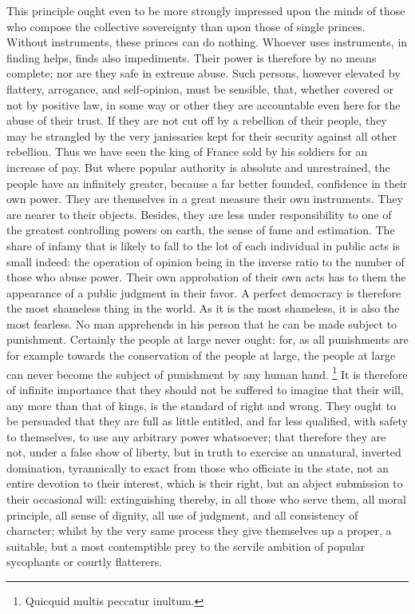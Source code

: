 This principle ought even to be more strongly impressed upon the minds of those who compose the collective sovereignty than upon those of single princes. Without instruments, these princes can do nothing. Whoever uses instruments, in finding helps, finds also impediments. Their power is therefore by no means complete; nor are they safe in extreme abuse. Such persons, however elevated by flattery, arrogance, and self-opinion, must be sensible, that, whether covered or not by positive law, in some way or other they are accountable even here for the abuse of their trust. If they are not cut off by a rebellion of their people, they may be strangled by the very janissaries kept for their security against all other rebellion. Thus we have seen the king of France sold by his soldiers for an increase of pay. But where popular authority is absolute and unrestrained, the people have an infinitely greater, because a far better founded, confidence in their own power. They are themselves in a great measure their own instruments. They are nearer to their objects. Besides, they are less under responsibility to one of the greatest controlling powers on earth, the sense of fame and estimation. The share of infamy that is likely to fall to the lot of each individual in public acts is small indeed: the operation of opinion being in the inverse ratio to the number of those who abuse power. Their own approbation of their own acts has to them the appearance of a public judgment in their favor. A perfect democracy is therefore the most shameless thing in the world. As it is the most shameless, it is also the most fearless. No man apprehends in his person that he can be made subject to punishment. Certainly the people at large never ought: for, as all punishments are for example towards the conservation of the people at large, the people at large can never become the subject of punishment by any human hand.
\footnote{ Quicquid multis peccatur inultum.}
 It is therefore of infinite importance that they should not be suffered to imagine that their will, any more than that of kings, is the standard of right and wrong. They ought to be persuaded that they are full as little entitled, and far less qualified, with safety to themselves, to use any arbitrary power whatsoever; that therefore they are not, under a false show of liberty, but in truth to exercise an unnatural, inverted domination, tyrannically to exact from those who officiate in the state, not an entire devotion to their interest, which is their right, but an abject submission to their occasional will: extinguishing thereby, in all those who serve them, all moral principle, all sense of dignity, all use of judgment, and all consistency of character; whilst by the very same process they give themselves up a proper, a suitable, but a most contemptible prey to the servile ambition of popular sycophants or courtly flatterers.


